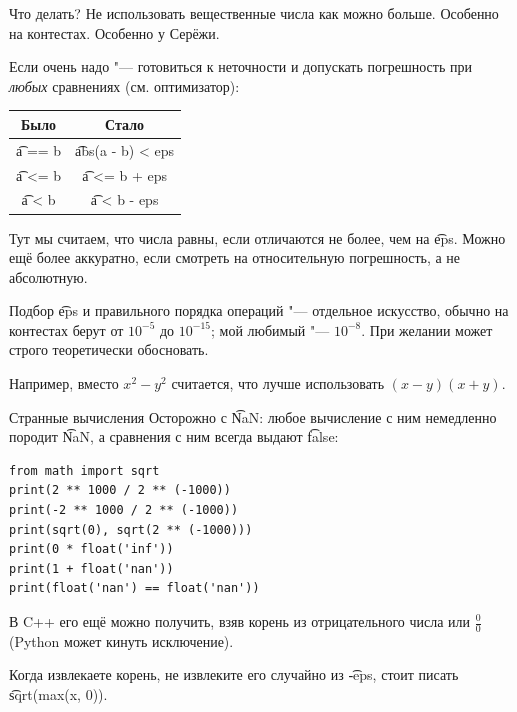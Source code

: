 \begin{frame}{Что делать?}
	Не использовать вещественные числа как можно больше.
	Особенно на контестах.
	Особенно у Серёжи.

	Если очень надо "--- готовиться к неточности и допускать погрешность при \textit{любых} сравнениях (см. оптимизатор):
	\begin{center}
		\begin{tabular}{|c|c|}
			\hline
			Было & Стало \\\hline
			\t{a == b} & \t{abs(a - b) < eps} \\\hline
			\t{a <= b} & \t{a <= b + eps}  \\\hline
			\t{a < b} & \t{a < b - eps} \\\hline
		\end{tabular}
	\end{center}
	Тут мы считаем, что числа равны, если отличаются не более, чем на \t{eps}.
	Можно ещё более аккуратно, если смотреть на относительную погрешность, а не абсолютную.

	Подбор \t{eps} и правильного порядка операций "--- отдельное искусство, обычно на контестах берут от $10^{-5}$ до $10^{-15}$; мой любимый "--- $10^{-8}$.
	При желании может строго теоретически обосновать.

	Например, вместо $x^2-y^2$ считается, что лучше использовать $(x-y)(x+y)$.
\end{frame}

\begin{frame}[fragile]{Странные вычисления}
	Осторожно с \t{NaN}: любое вычисление с ним немедленно породит \t{NaN}, а сравнения с ним всегда выдают \t{false}:
\begin{verbatim}
from math import sqrt
print(2 ** 1000 / 2 ** (-1000))
print(-2 ** 1000 / 2 ** (-1000))
print(sqrt(0), sqrt(2 ** (-1000)))
print(0 * float('inf'))
print(1 + float('nan'))
print(float('nan') == float('nan'))
\end{verbatim}
	В C++ его ещё можно получить, взяв корень из отрицательного числа или $\frac{0}{0}$ (Python может кинуть исключение).

	Когда извлекаете корень, не извлеките его случайно из \t{-eps}, стоит писать \t{sqrt(max(x, 0))}.
\end{frame}

